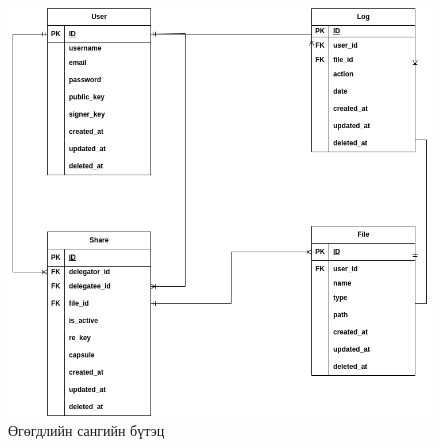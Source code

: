\begin{figure}[H]
    \centering
    \includegraphics[scale=0.4]{Figures/system_schemes/database.drawio.png}
    \caption{Өгөгдлийн сангийн бүтэц}
    \label{fig:database}
\end{figure}

